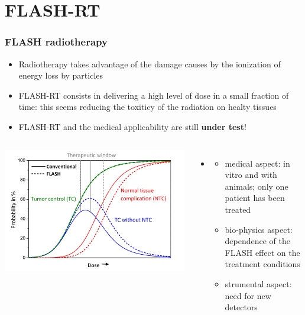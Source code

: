 \section{FLASH-RT}

    \begin{frame}
        \frametitle{FLASH radiotherapy}
        \begin{itemize}
            \item Radiotherapy takes advantage of the damage causes by the ionization of energy loss by particles
            \item FLASH-RT consists in delivering a high level of dose in a small fraction of time: this seems reducing the toxiticy of the radiation on healty tissues
            \item FLASH-RT and the medical applicability are still \textbf{under test}!
        \end{itemize}
        \medskip
        \begin{columns}
                \includegraphics[width=1.2\linewidth]{figures/pixel_detectors_usage/curve_flash.png}
            \begin{itemize}
                \item %
                \begin{itemize}
                    \item medical aspect: in vitro and with animals; only one patient has been treated
                    \item  bio-physics aspect: dependence of the FLASH effect on the treatment conditions 
                    \item  strumental aspect: need for new detectors
                \end{itemize}
            \end{itemize}
        \end{columns}
    \end{frame} 


